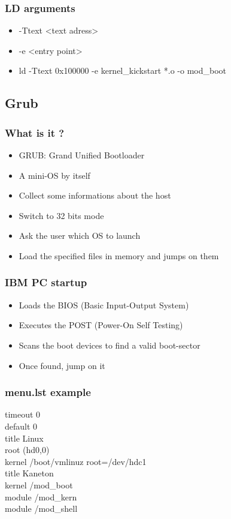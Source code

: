 \documentclass{beamer}
\begin{document}
\begin{frame}
  \frametitle{LD arguments}

  \begin{itemize}
  \item
    -Ttext <text adress>
  \item
    -e <entry point>
  \end{itemize}
  \begin{itemize}
  \item
    ld -Ttext 0x100000 -e kernel\_kickstart *.o -o mod\_boot
  \end{itemize}
\end{frame}

\subsection{Grub}

\begin{frame}
  \frametitle{What is it ?}

  \begin{itemize}
  \item
    GRUB: Grand Unified Bootloader
  \item
    A mini-OS by itself
  \item
    Collect some informations about the host
  \item
    Switch to 32 bits mode
  \item
    Ask the user which OS to launch
  \item
    Load the specified files in memory and jumps on them
  \end{itemize}
\end{frame}

\begin{frame}
  \frametitle{IBM PC startup}

  \begin{itemize}
  \item<1->
    Loads the BIOS (Basic Input-Output System)
  \item<2->
    Executes the POST (Power-On Self Testing)
  \item<3->
    Scans the boot devices to find a valid boot-sector
  \item<4->
    Once found, jump on it
  \end{itemize}
\end{frame}

\begin{frame}
  \frametitle{menu.lst example}

  timeout 0\\
  default 0\\
\vspace{10pt}
  title  Linux\\
  root   (hd0,0)\\
  kernel /boot/vmlinuz root=/dev/hdc1\\
\vspace{10pt}
  title Kaneton\\
  kernel /mod\_boot\\
  module /mod\_kern\\
  module /mod\_shell
\end{frame}
\end{document}

